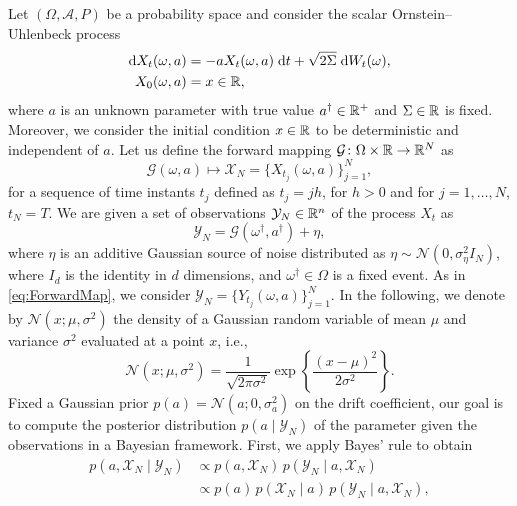 \documentclass[10pt]{article}
\begin{document}
\maketitle	

Let $(\Omega, \mathcal A, P)$ be a probability space and consider the scalar Ornstein--Uhlenbeck process
\begin{equation}\label{eq:OU}
\begin{aligned}
	\mathrm{d} X_t(\omega, a) &= -a X_t(\omega, a) \; \mathrm{d} t + \sqrt{2\Sigma} \; \mathrm{d} W_t(\omega),\\
	X_0(\omega, a) &= x \in \mathbb{R},
\end{aligned}
\end{equation}
where $a$ is an unknown parameter with true value $a^\dagger \in \mathbb{R}^+$ and $\Sigma \in \mathbb{R}$ is fixed. Moreover, we consider the initial condition $x\in\mathbb{R}$ to be deterministic and independent of $a$. Let us define the forward mapping $\mathcal G\colon \Omega \times \mathbb{R} \to \mathbb{R}^N$ as
\begin{equation}\label{eq:ForwardMap}
	\mathcal G(\omega, a) \mapsto \mathcal X_N = \{X_{t_j}(\omega, a)\}_{j=1}^N,
\end{equation}
for a sequence of time instants $t_j$ defined as $t_j = jh$, for $h > 0$ and for $j = 1, \ldots, N$, $t_N = T$. We are given a set of observations $\mathcal Y_N \in \mathbb{R}^n$ of the process $X_t$ as
\begin{equation}\label{eq:Observations}
	\mathcal Y_N = \mathcal G(\omega^\dagger, a^\dagger) + \eta,
\end{equation}
where $\eta$ is an additive Gaussian source of noise distributed as $\eta \sim \mathcal N(0, \sigma^2_\eta I_N)$, where $I_d$ is the identity in $d$ dimensions, and $\omega^\dagger \in \Omega$ is a fixed event. As in \eqref{eq:ForwardMap}, we consider $\mathcal Y_N = \{Y_{t_j}(\omega, a)\}_{j=1}^N$. In the following, we denote by $\mathcal N(x; \mu, \sigma^2)$ the density of a Gaussian random variable of mean $\mu$ and variance $\sigma^2$ evaluated at a point $x$, i.e.,
\begin{equation}
	\mathcal N(x; \mu, \sigma^2) = \frac{1}{\sqrt{2\pi\sigma^2}} \exp\left\{ \frac{(x - \mu)^2}{2\sigma^2} \right\}.
\end{equation}
Fixed a Gaussian prior $p(a) = \mathcal N(a; 0, \sigma^2_a)$ on the drift coefficient, our goal is to compute the posterior distribution $p(a \mid \mathcal Y_N)$ of the parameter given the observations in a Bayesian framework. First, we apply Bayes' rule to obtain
\begin{equation}
\begin{aligned}
	p(a, \mathcal X_N \mid \mathcal Y_N) &\propto p(a, \mathcal X_N) \, p(\mathcal Y_N \mid a, \mathcal X_N)\\
	&\propto p(a) \, p(\mathcal X_N \mid a) \, p(\mathcal Y_N \mid a, \mathcal X_N),
\end{aligned}
\end{equation}
\end{document}
